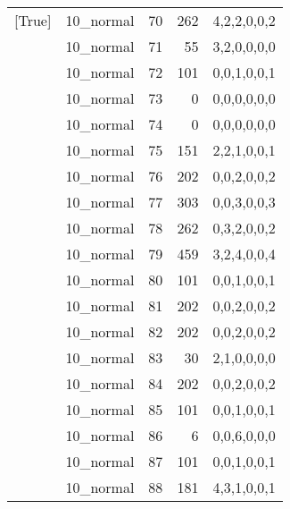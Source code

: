\begin{tabular}{llrrl}
 [True]          & 10\_normal           &            70 &                   262 & 4,2,2,0,0,2   \\
 [True]          & 10\_normal           &            71 &                    55 & 3,2,0,0,0,0   \\
 [True]          & 10\_normal           &            72 &                   101 & 0,0,1,0,0,1   \\
 [True]          & 10\_normal           &            73 &                     0 & 0,0,0,0,0,0   \\
 [True]          & 10\_normal           &            74 &                     0 & 0,0,0,0,0,0   \\
 [True]          & 10\_normal           &            75 &                   151 & 2,2,1,0,0,1   \\
 [True]          & 10\_normal           &            76 &                   202 & 0,0,2,0,0,2   \\
 [True]          & 10\_normal           &            77 &                   303 & 0,0,3,0,0,3   \\
 [True]          & 10\_normal           &            78 &                   262 & 0,3,2,0,0,2   \\
 [True]          & 10\_normal           &            79 &                   459 & 3,2,4,0,0,4   \\
 [True]          & 10\_normal           &            80 &                   101 & 0,0,1,0,0,1   \\
 [True]          & 10\_normal           &            81 &                   202 & 0,0,2,0,0,2   \\
 [True]          & 10\_normal           &            82 &                   202 & 0,0,2,0,0,2   \\
 [True]          & 10\_normal           &            83 &                    30 & 2,1,0,0,0,0   \\
 [True]          & 10\_normal           &            84 &                   202 & 0,0,2,0,0,2   \\
 [True]          & 10\_normal           &            85 &                   101 & 0,0,1,0,0,1   \\
 [True]          & 10\_normal           &            86 &                     6 & 0,0,6,0,0,0   \\
 [True]          & 10\_normal           &            87 &                   101 & 0,0,1,0,0,1   \\
 [True]          & 10\_normal           &            88 &                   181 & 4,3,1,0,0,1   \\

\end{tabular}
